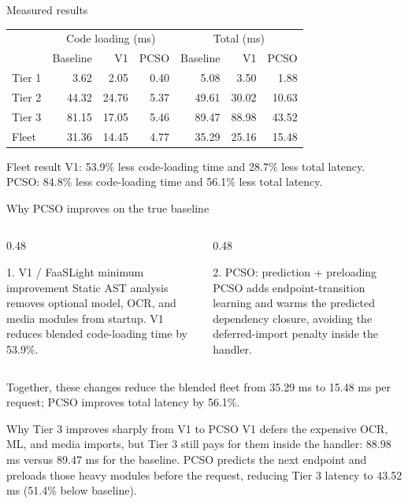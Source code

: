 \documentclass[aspectratio=169,10pt]{beamer}
\begin{document}
\begin{frame}{Measured results}
\begin{table}\centering\scriptsize
\begin{tabular}{@{}lrrr|rrr@{}}\toprule
& \multicolumn{3}{c|}{Code loading (ms)} & \multicolumn{3}{c}{Total (ms)}\\
& Baseline & V1 & PCSO & Baseline & V1 & PCSO\\\midrule
Tier 1 & 3.62 & 2.05 & 0.40 & 5.08 & 3.50 & 1.88\\
Tier 2 & 44.32 & 24.76 & 5.37 & 49.61 & 30.02 & 10.63\\
Tier 3 & 81.15 & 17.05 & 5.46 & 89.47 & 88.98 & 43.52\\
Fleet & 31.36 & 14.45 & 4.77 & 35.29 & 25.16 & 15.48\\\bottomrule
\end{tabular}
\end{table}
\begin{block}{Fleet result}
V1: 53.9\% less code-loading time and 28.7\% less total latency.\\
PCSO: 84.8\% less code-loading time and 56.1\% less total latency.
\end{block}
\end{frame}

\begin{frame}{Why PCSO improves on the true baseline}
\begin{columns}[T]
\begin{column}{0.48\textwidth}
\begin{block}{1. V1 / FaaSLight minimum improvement}
Static AST analysis removes optional model, OCR, and media modules from startup. V1 reduces blended code-loading time by 53.9\%.
\end{block}
\end{column}
\begin{column}{0.48\textwidth}
\begin{alertblock}{2. PCSO: prediction + preloading}
PCSO adds endpoint-transition learning and warms the predicted dependency closure, avoiding the deferred-import penalty inside the handler.
\end{alertblock}
\end{column}
\end{columns}
\vspace{1em}
Together, these changes reduce the blended fleet from 35.29 ms to 15.48 ms per request; PCSO improves total latency by 56.1\%.
\vspace{0.6em}
\begin{exampleblock}{Why Tier 3 improves sharply from V1 to PCSO}
V1 defers the expensive OCR, ML, and media imports, but Tier 3 still pays for them inside the handler: 88.98 ms versus 89.47 ms for the baseline. PCSO predicts the next endpoint and preloads those heavy modules before the request, reducing Tier 3 latency to 43.52 ms (51.4\% below baseline).
\end{exampleblock}
\end{frame}
\end{document}

